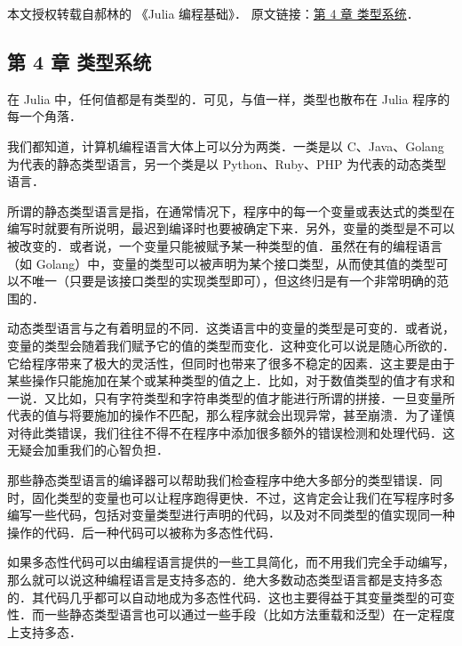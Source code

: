 
本文授权转载自郝林的 《Julia 编程基础》． 原文链接：\href{https://github.com/hyper0x/JuliaBasics/blob/master/book/ch04.md}{第 4 章 类型系统}．

\subsection{第 4 章 类型系统}

在 Julia 中，任何值都是有类型的．可见，与值一样，类型也散布在 Julia 程序的每一个角落．

我们都知道，计算机编程语言大体上可以分为两类．一类是以 C、Java、Golang 为代表的静态类型语言，另一个类是以 Python、Ruby、PHP 为代表的动态类型语言．

所谓的静态类型语言是指，在通常情况下，程序中的每一个变量或表达式的类型在编写时就要有所说明，最迟到编译时也要被确定下来．另外，变量的类型是不可以被改变的．或者说，一个变量只能被赋予某一种类型的值．虽然在有的编程语言（如 Golang）中，变量的类型可以被声明为某个接口类型，从而使其值的类型可以不唯一（只要是该接口类型的实现类型即可），但这终归是有一个非常明确的范围的．

动态类型语言与之有着明显的不同．这类语言中的变量的类型是可变的．或者说，变量的类型会随着我们赋予它的值的类型而变化．这种变化可以说是随心所欲的．它给程序带来了极大的灵活性，但同时也带来了很多不稳定的因素．这主要是由于某些操作只能施加在某个或某种类型的值之上．比如，对于数值类型的值才有求和一说．又比如，只有字符类型和字符串类型的值才能进行所谓的拼接．一旦变量所代表的值与将要施加的操作不匹配，那么程序就会出现异常，甚至崩溃．为了谨慎对待此类错误，我们往往不得不在程序中添加很多额外的错误检测和处理代码．这无疑会加重我们的心智负担．

那些静态类型语言的编译器可以帮助我们检查程序中绝大多部分的类型错误．同时，固化类型的变量也可以让程序跑得更快．不过，这肯定会让我们在写程序时多编写一些代码，包括对变量类型进行声明的代码，以及对不同类型的值实现同一种操作的代码．后一种代码可以被称为多态性代码．

如果多态性代码可以由编程语言提供的一些工具简化，而不用我们完全手动编写，那么就可以说这种编程语言是支持多态的．绝大多数动态类型语言都是支持多态的．其代码几乎都可以自动地成为多态性代码．这也主要得益于其变量类型的可变性．而一些静态类型语言也可以通过一些手段（比如方法重载和泛型）在一定程度上支持多态．